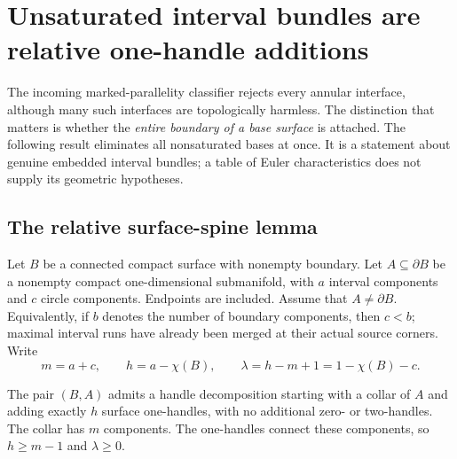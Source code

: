 \section{Unsaturated interval bundles are relative one-handle additions}
\label{sec:unsaturated}

The incoming marked-parallelity classifier rejects every annular interface,
although many such interfaces are topologically harmless.  The distinction
that matters is whether the \emph{entire boundary of a base surface} is
attached.  The following result eliminates all nonsaturated bases at once.
It is a statement about genuine embedded interval bundles; a table of
Euler characteristics does not supply its geometric hypotheses.

\subsection{The relative surface-spine lemma}

Let $B$ be a connected compact surface with nonempty boundary.  Let
$A\subseteq\partial B$ be a nonempty compact one-dimensional submanifold,
with $a$ interval components and $c$ circle components.  Endpoints are
included.  Assume that $A\ne\partial B$.  Equivalently, if $b$ denotes the
number of boundary components, then $c<b$; maximal interval runs have
already been merged at their actual source corners.  Write
\[
 m=a+c,\qquad h=a-\chi(B),\qquad
 \lambda=h-m+1=1-\chi(B)-c.
\]

\begin{lemma}\label{lem:relative-bands}
The pair $(B,A)$ admits a handle decomposition starting with a collar of
$A$ and adding exactly $h$ surface one-handles, with no additional zero-
or two-handles.  The collar has $m$ components.  The one-handles connect
these components, so $h\geq m-1$ and $\lambda\geq0$.
\end{lemma}

